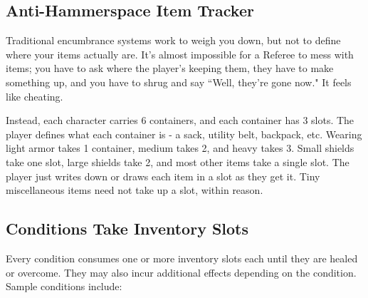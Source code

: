 \documentclass[twoside]{article}
\begin{document}
\subsection*{Anti-Hammerspace Item Tracker}

Traditional encumbrance systems work to weigh you down, but not to define where your items actually are. It's almost impossible for a Referee to mess with items; you have to ask where the player's keeping them, they have to make something up, and you have to shrug and say ``Well, they're gone now." It feels like cheating.

Instead, each character carries 6 containers, and each container has 3 slots. The player defines what each container is - a sack, utility belt, backpack, etc. Wearing light armor takes 1 container, medium takes 2, and heavy takes 3. Small shields take one slot, large shields take 2, and most other items take a single slot. The player just writes down or draws each item in a slot as they get it. Tiny miscellaneous items need not take up a slot, within reason.

\subsection*{Conditions Take Inventory Slots}

Every condition consumes one or more inventory slots each until they are healed or overcome. They may also incur additional effects depending on the condition. Sample conditions include: 
\end{document}
